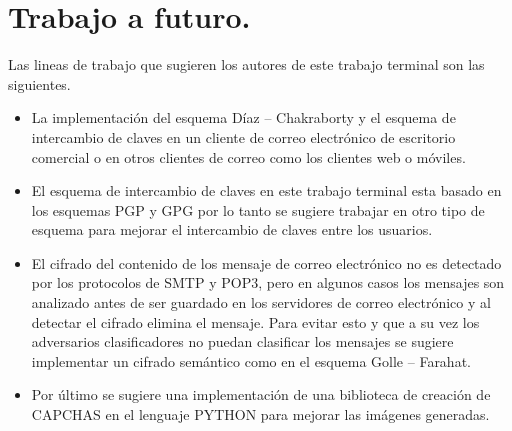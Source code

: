 \section{Trabajo a futuro.}

Las lineas de trabajo que sugieren los autores de este trabajo terminal son las siguientes.
\begin{itemize}
\item La implementación del esquema Díaz – Chakraborty y el esquema de intercambio de claves en un cliente de correo electrónico de escritorio comercial o en otros clientes de correo como los clientes web o móviles.
\item El esquema de intercambio de claves en este trabajo terminal esta basado en los esquemas PGP y GPG por lo tanto se sugiere trabajar en otro tipo de esquema para mejorar el intercambio de claves entre los usuarios.
\item El cifrado del contenido de los mensaje de correo electrónico no es detectado por los protocolos de SMTP y POP3, pero en algunos casos los mensajes son analizado antes de ser guardado en los servidores de correo electrónico y al detectar el cifrado elimina el mensaje. Para evitar esto y que a su vez los adversarios clasificadores no puedan clasificar los mensajes se sugiere implementar un cifrado semántico como en el esquema Golle – Farahat.
\item Por último se sugiere una implementación de una biblioteca  de creación de CAPCHAS en el lenguaje PYTHON para mejorar las imágenes generadas.
\end{itemize}
